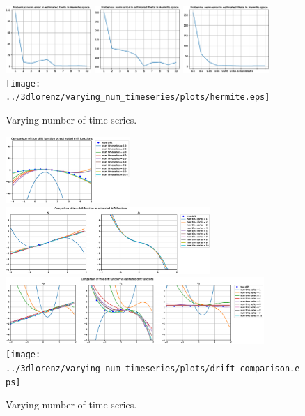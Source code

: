 \documentclass{article}
\begin{document}
\begin{figure}[th]
\includegraphics[height=1in]{../1dcode/varying_num_timeseries/plots/hermite.eps}
\includegraphics[height=1in]{../2dcode/varying_num_timeseries/plots/hermite.eps}
\includegraphics[height=1in]{../3ddampedduffing/varying_num_timeseries/plots/hermite.eps}
\texttt{[image: ../3dlorenz/varying\_num\_timeseries/plots/hermite.eps]}
\caption{Varying number of time series.}
\label{fig:exp1}
\end{figure}

\begin{figure}[th]
\includegraphics[height=1in]{../1dcode/varying_num_timeseries/plots/drift_comparison.eps}
\includegraphics[height=1in]{../2dcode/varying_num_timeseries/plots/drift_comparison.eps}
\includegraphics[height=1in]{../3ddampedduffing/varying_num_timeseries/plots/drift_comparison.eps}
\texttt{[image: ../3dlorenz/varying\_num\_timeseries/plots/drift\_comparison.eps]}
\caption{Varying number of time series.}
\label{fig:exp1}
\end{figure}
\end{document}
